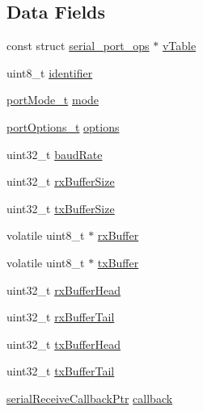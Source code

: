 \subsection*{Data Fields}
\begin{DoxyCompactItemize}
\item 
const struct \hyperlink{structserial__port__ops}{serial\+\_\+port\+\_\+ops} $\ast$ \hyperlink{structserialPort__s_a34878c8792ffcb3ab7e259e08159e903}{v\+Table}
\item 
uint8\+\_\+t \hyperlink{structserialPort__s_af870527b1c7afabc4bbe1a9fef9ccc07}{identifier}
\item 
\hyperlink{drivers_2serial_8h_ae93363f27f1a41ae63f3bb5b8170e661}{port\+Mode\+\_\+t} \hyperlink{structserialPort__s_a946434b55d1d355e8eea515407d659f9}{mode}
\item 
\hyperlink{drivers_2serial_8h_a1c894642b7e3db5ca0401c3507e8434f}{port\+Options\+\_\+t} \hyperlink{structserialPort__s_a721d589edb8e0dfc5e552f99bf7282c1}{options}
\item 
uint32\+\_\+t \hyperlink{structserialPort__s_a1e2ecc19b222b212cf5e60ff96f8eab2}{baud\+Rate}
\item 
uint32\+\_\+t \hyperlink{structserialPort__s_a5864af6c199407ad646021c2f5f0cb02}{rx\+Buffer\+Size}
\item 
uint32\+\_\+t \hyperlink{structserialPort__s_a867db18c473dfe7f276c158d19a70999}{tx\+Buffer\+Size}
\item 
volatile uint8\+\_\+t $\ast$ \hyperlink{structserialPort__s_a580cdb6b1bdded48e06b858f8073f929}{rx\+Buffer}
\item 
volatile uint8\+\_\+t $\ast$ \hyperlink{structserialPort__s_af20899d41c8611184d638177f626da96}{tx\+Buffer}
\item 
uint32\+\_\+t \hyperlink{structserialPort__s_a80011aa690b3b17a48ae0682675c9a69}{rx\+Buffer\+Head}
\item 
uint32\+\_\+t \hyperlink{structserialPort__s_aa7301fc146e7c50b4df45b29ff1639d4}{rx\+Buffer\+Tail}
\item 
uint32\+\_\+t \hyperlink{structserialPort__s_adf83f67cac7d47e0fa7608865e6074bc}{tx\+Buffer\+Head}
\item 
uint32\+\_\+t \hyperlink{structserialPort__s_a1f1a7261e0b3d90e5771312ca6807dfc}{tx\+Buffer\+Tail}
\item 
\hyperlink{drivers_2serial_8h_a487fbdc83dcad54ab5d0c79b54565bf2}{serial\+Receive\+Callback\+Ptr} \hyperlink{structserialPort__s_a90bf7c36a806c5e299c10d6c74f8af25}{callback}
\end{DoxyCompactItemize}


